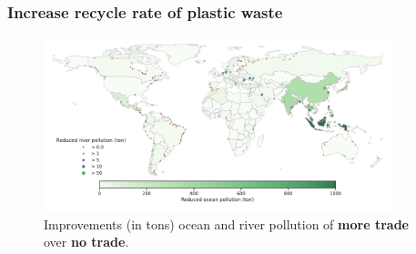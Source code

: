\documentclass[dvipsnames]{article}
\begin{document}
\subsubsection{Increase recycle rate of plastic waste}
\label{sec:recycle-policy}
\begin{figure}[htb!] 
	\centering
		\includegraphics[width=0.9\textwidth]{figures/improvement_w10_ton.pdf}
	\caption{\small Improvements (in tons) ocean and river pollution of \textbf{more trade} over \textbf{no trade}.}
	\label{fig:improvement_w10}
\end{figure}
\end{document}
